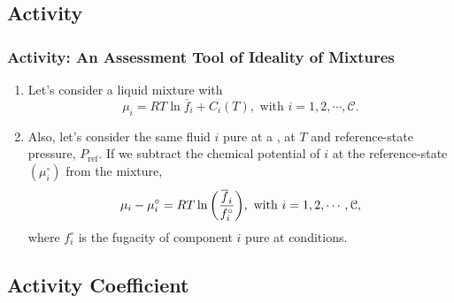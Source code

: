\documentclass[10pt,compress,unknownkeysallowed]{beamer}
\begin{document}
\subsection{Activity}
\begin{frame}
  \frametitle{Activity: An Assessment Tool of Ideality of Mixtures}
        \begin{enumerate}%
           \item<1-> Let's consider a liquid mixture with
               \begin{displaymath}
                  \mu_{i} = RT\ln{\overline{f}_{i}} + C_{i}(T), \text{ with } i=1, 2, \cdots, \mathcal{C}.
               \end{displaymath}
           \item<2-> Also, let's consider the same fluid $i$ pure at a , \ie at $T$ and reference-state pressure, $P_{\text{ref}}$. If we subtract the chemical potential of $i$ at the reference-state $\left(\mu_{i}^{\circ}\right)$ from the mixture,
               \begin{displaymath}
                  \mu_{i} - \mu_{i}^{\circ} = RT\ln{\left(\displaystyle\frac{\overline{f}_{i}}{f_{i}^{\circ}}\right)} , \text{ with } i=1, 2, \cdots, \mathcal{C},
               \end{displaymath}
               where $f_{i}^{\circ}$ is the fugacity of component $i$ pure at  conditions.
           
               
        \end{enumerate}
\end{frame}
\normalsize


\subsection{Activity Coefficient}
\end{document}

